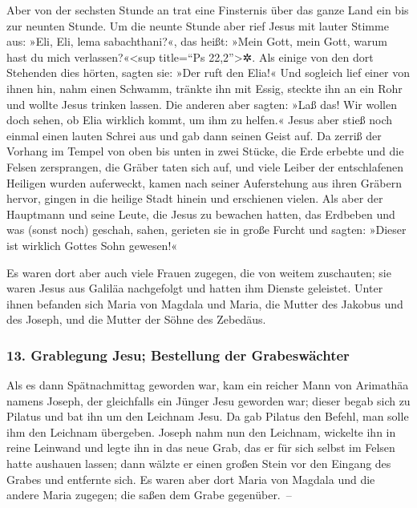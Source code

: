  Aber von der sechsten Stunde an trat eine Finsternis
über das ganze Land ein bis zur neunten Stunde.  Um die
neunte Stunde aber rief Jesus mit lauter Stimme aus: »Eli, Eli, lema
sabachthani?«, das heißt: »Mein Gott, mein Gott, warum hast du mich
verlassen?«\textless sup title=``Ps 22,2''\textgreater✲. 
Als einige von den dort Stehenden dies hörten, sagten sie: »Der ruft den
Elia!«  Und sogleich lief einer von ihnen hin, nahm einen
Schwamm, tränkte ihn mit Essig, steckte ihn an ein Rohr und wollte Jesus
trinken lassen.  Die anderen aber sagten: »Laß das! Wir
wollen doch sehen, ob Elia wirklich kommt, um ihm zu helfen.«
 Jesus aber stieß noch einmal einen lauten Schrei aus und
gab dann seinen Geist auf.  Da zerriß der Vorhang im
Tempel von oben bis unten in zwei Stücke, die Erde erbebte und die
Felsen zersprangen,  die Gräber taten sich auf, und viele
Leiber der entschlafenen Heiligen wurden auferweckt, 
kamen nach seiner Auferstehung aus ihren Gräbern hervor, gingen in die
heilige Stadt hinein und erschienen vielen.  Als aber der
Hauptmann und seine Leute, die Jesus zu bewachen hatten, das Erdbeben
und was (sonst noch) geschah, sahen, gerieten sie in große Furcht und
sagten: »Dieser ist wirklich Gottes Sohn gewesen!«

 Es waren dort aber auch viele Frauen zugegen, die von
weitem zuschauten; sie waren Jesus aus Galiläa nachgefolgt und hatten
ihm Dienste geleistet.  Unter ihnen befanden sich Maria
von Magdala und Maria, die Mutter des Jakobus und des Joseph, und die
Mutter der Söhne des Zebedäus.

\hypertarget{grablegung-jesu-bestellung-der-grabeswuxe4chter}{%
\subsubsection{13. Grablegung Jesu; Bestellung der
Grabeswächter}\label{grablegung-jesu-bestellung-der-grabeswuxe4chter}}

 Als es dann Spätnachmittag geworden war, kam ein reicher
Mann von Arimathäa namens Joseph, der gleichfalls ein Jünger Jesu
geworden war;  dieser begab sich zu Pilatus und bat ihn
um den Leichnam Jesu. Da gab Pilatus den Befehl, man solle ihm den
Leichnam übergeben.  Joseph nahm nun den Leichnam,
wickelte ihn in reine Leinwand  und legte ihn in das neue
Grab, das er für sich selbst im Felsen hatte aushauen lassen; dann
wälzte er einen großen Stein vor den Eingang des Grabes und entfernte
sich.  Es waren aber dort Maria von Magdala und die
andere Maria zugegen; die saßen dem Grabe gegenüber.~--

